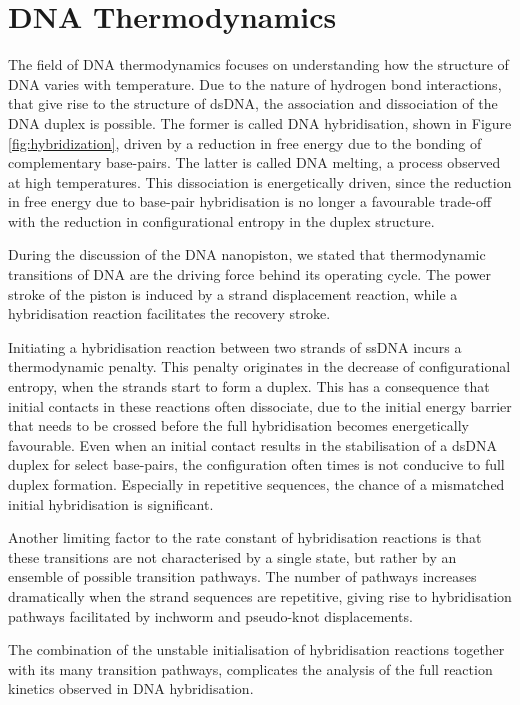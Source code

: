 \section{DNA Thermodynamics}

 The field of DNA thermodynamics focuses on understanding how the structure of DNA varies
with temperature. Due to the nature of hydrogen bond interactions, that give rise to the
structure of dsDNA, the association and dissociation of the DNA duplex is possible. The
former is called DNA hybridisation, shown in Figure \ref{fig:hybridization}, driven by a
reduction in free
energy due to the bonding of complementary base-pairs. The latter is called DNA
melting, a process observed at high temperatures. This dissociation is
energetically driven, since the reduction in free energy due to base-pair hybridisation
is no longer a favourable trade-off with the reduction in configurational entropy in the
duplex structure.

During the discussion of the DNA nanopiston, we stated that thermodynamic transitions of
DNA are the driving force behind its operating cycle. The power stroke of the piston is
induced by a strand displacement reaction, while a hybridisation
reaction facilitates the recovery stroke.

Initiating a hybridisation reaction between two strands of ssDNA incurs a thermodynamic
penalty. This penalty originates in the decrease of configurational entropy, when the
strands start to form a duplex. This has a consequence that initial contacts in these
reactions often dissociate, due to the initial energy barrier that needs to be crossed
before the full hybridisation becomes energetically favourable. Even when an initial
contact
results in the stabilisation of a dsDNA duplex for select base-pairs, the configuration
often times is not conducive to full duplex formation. Especially in repetitive
sequences, the chance of a mismatched initial hybridisation is significant.

Another limiting factor to the rate constant of hybridisation reactions is that these
transitions are not characterised by a single state, but rather by an ensemble of
possible transition pathways. The number of pathways increases dramatically when the
strand sequences are repetitive, giving rise to hybridisation pathways facilitated by
inchworm and pseudo-knot displacements.\cite{Ouldridge2013}

The combination of the unstable initialisation of hybridisation reactions together
with its many transition pathways, complicates the analysis of the full reaction kinetics
observed in DNA hybridisation.



